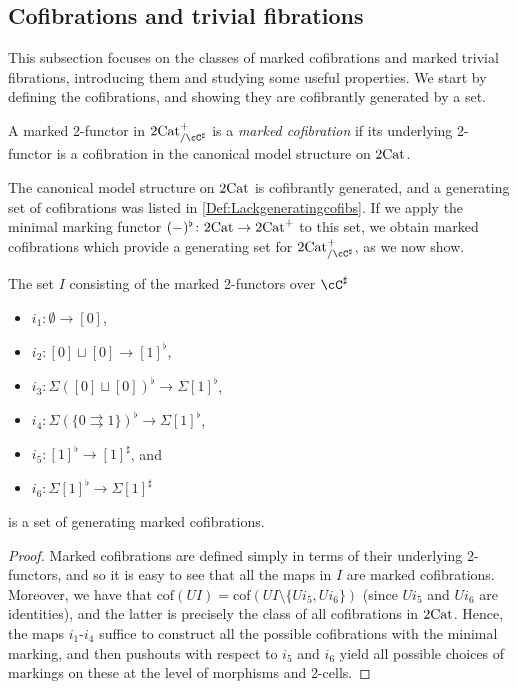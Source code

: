 \documentclass[11pt, dvipsnames]{amsart}
\begin{document}
    \subsection{Cofibrations and trivial fibrations}\label{sec:cofibandtrivfib}

		This subsection focuses on the classes of marked cofibrations and marked trivial fibrations, introducing them and studying some useful properties. We start by defining the cofibrations,  and showing they are cofibrantly generated by a set.

		\begin{defn}\label{Def:cofibrations}
			A marked 2-functor in $\twocat^{+}_{/\cC^\sharp}$  is a \emph{marked cofibration} if its underlying 2-functor is a cofibration in the canonical model structure on $2\mathrm{Cat}$. 
		\end{defn}

		The canonical model structure on $2\mathrm{Cat}$ is cofibrantly generated, and a generating set of cofibrations was listed in \cref{Def:Lackgeneratingcofibs}. If we apply the minimal marking functor $(-)^{\flat}\colon2\mathrm{Cat} \to 2\mathrm{Cat}^{+}$ to this set, we obtain marked cofibrations which provide a generating set for $\twocat^{+}_{/\cC^\sharp}$, as we now show.

		\begin{prop}\label{prop:genmarkedcofibs}
			The set $I$ consisting of the marked 2-functors over $\cC^\sharp$
                \begin{itemize}
                \item $i_1\colon \emptyset\to [0]$,
                \item $i_2\colon [0]\sqcup  [0]\to [1]^\flat$,
                \item $i_3\colon \Sigma([0]\sqcup  [0])^\flat\to \Sigma [1]^\flat$,
                \item $i_4\colon \Sigma(\{0 \rightrightarrows 1\})^\flat \to \Sigma[1]^\flat$,
                \item  $i_5\colon [1]^{\flat}\to [1]^{\sharp}$, and \item $i_6 \colon \Sigma{[1]^{\flat}} \to \Sigma{[1]^{\sharp}}$
            \end{itemize}
           is a set of generating marked cofibrations.
		\end{prop}
		\begin{proof}
            Marked cofibrations are defined simply in terms of their underlying 2-functors, and so it is easy to see that all the maps in $I$ are marked cofibrations. Moreover, we have that $\mathrm{cof}(UI)=\mathrm{cof}(UI\setminus \{Ui_5,U i_6\})$ (since $Ui_5$ and $Ui_6$ are identities), and the latter is precisely the class of all cofibrations in $2\mathrm{Cat}$. Hence, the maps $i_1$-$i_4$ suffice to construct all the possible cofibrations with the minimal marking, and then pushouts with respect to $i_5$ and $i_6$ yield all possible choices of markings on these at the level of morphisms and 2-cells.
		\end{proof} 
\end{document}
